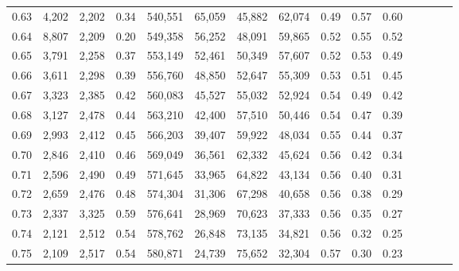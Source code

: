 \begin{tabular}{rrrcrrrrrrrrrrr}
0.63 &   4,202 &  2,202 &                                       0.34 &  540,551 &   65,059 &   45,882 &   62,074 &  0.49 &  0.57 &                         0.60 \\
0.64 &   8,807 &  2,209 &                                       0.20 &  549,358 &   56,252 &   48,091 &   59,865 &  0.52 &  0.55 &                         0.52 \\
0.65 &   3,791 &  2,258 &                                       0.37 &  553,149 &   52,461 &   50,349 &   57,607 &  0.52 &  0.53 &                         0.49 \\
0.66 &   3,611 &  2,298 &                                       0.39 &  556,760 &   48,850 &   52,647 &   55,309 &  0.53 &  0.51 &                         0.45 \\
0.67 &   3,323 &  2,385 &                                       0.42 &  560,083 &   45,527 &   55,032 &   52,924 &  0.54 &  0.49 &                         0.42 \\
0.68 &   3,127 &  2,478 &                                       0.44 &  563,210 &   42,400 &   57,510 &   50,446 &  0.54 &  0.47 &                         0.39 \\
0.69 &   2,993 &  2,412 &                                       0.45 &  566,203 &   39,407 &   59,922 &   48,034 &  0.55 &  0.44 &                         0.37 \\
0.70 &   2,846 &  2,410 &                                       0.46 &  569,049 &   36,561 &   62,332 &   45,624 &  0.56 &  0.42 &                         0.34 \\
0.71 &   2,596 &  2,490 &                                       0.49 &  571,645 &   33,965 &   64,822 &   43,134 &  0.56 &  0.40 &                         0.31 \\
0.72 &   2,659 &  2,476 &                                       0.48 &  574,304 &   31,306 &   67,298 &   40,658 &  0.56 &  0.38 &                         0.29 \\
0.73 &   2,337 &  3,325 &                                       0.59 &  576,641 &   28,969 &   70,623 &   37,333 &  0.56 &  0.35 &                         0.27 \\
0.74 &   2,121 &  2,512 &                                       0.54 &  578,762 &   26,848 &   73,135 &   34,821 &  0.56 &  0.32 &                         0.25 \\
0.75 &   2,109 &  2,517 &                                       0.54 &  580,871 &   24,739 &   75,652 &   32,304 &  0.57 &  0.30 &                         0.23 \\

\end{tabular}
